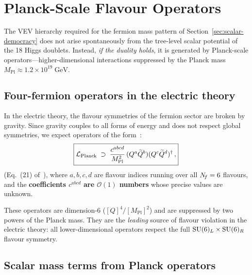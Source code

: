 \documentclass[11pt,a4paper]{article}
\begin{document}
\section{Planck-Scale Flavour Operators}
\label{sec:planck-operators}

The VEV hierarchy required for the fermion mass pattern of
Section~\ref{sec:scalar-democracy} does not arise spontaneously from
the tree-level scalar potential of the 18 Higgs doublets.  Instead,
\emph{if the duality holds}, it is generated by Planck-scale
operators---higher-dimensional interactions suppressed by the Planck
mass $M_{\text{Pl}} \approx 1.2 \times 10^{19}\;\text{GeV}$.

\subsection{Four-fermion operators in the electric theory}

In the electric theory, the flavour symmetries of the fermion sector
are broken by gravity.  Since gravity couples to all forms of energy and
does not respect global symmetries, we expect operators of the
form~\cite{CacciapagliaSannino2024}:
\begin{equation}\label{eq:planck-operator}
  \boxed{%
  \mathcal{L}_{\text{Planck}}
  \;\supset\;
  \frac{c^{abcd}}{M_{\text{Pl}}^2}\,
  (Q^a \widetilde{Q}^b)(Q^c \widetilde{Q}^d)^\dagger\,,}
\end{equation}
(Eq.~(21) of~\cite{CacciapagliaSannino2024}), where $a,b,c,d$ are
flavour indices running over all $N_{\!f} = 6$ flavours, and the
\textbf{coefficients $c^{abcd}$ are $\mathcal{O}(1)$ numbers} whose
precise values are unknown.

These operators are dimension-6 ($[Q]^4 / [M_{\text{Pl}}]^2$) and
are suppressed by two powers of the Planck mass.  They are the
\emph{leading} source of flavour violation in the electric theory:
all lower-dimensional operators respect the full
$\mathrm{SU}(6)_L \times \mathrm{SU}(6)_R$ flavour symmetry.

\subsection{Scalar mass terms from Planck operators}
\end{document}
